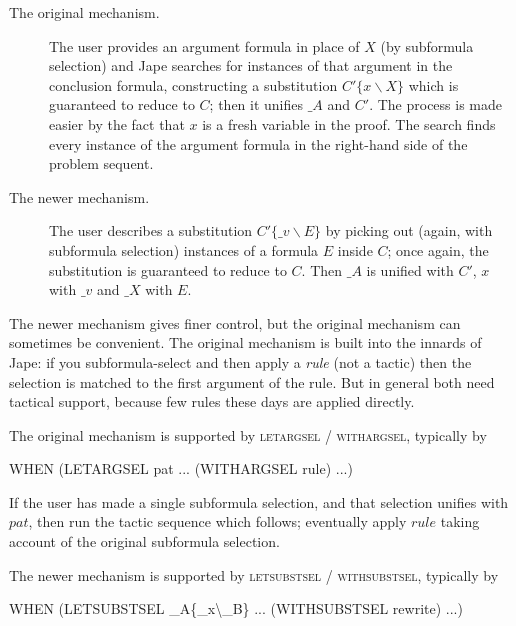\begin{description}
\item[The original mechanism.] 
The user provides an argument formula in place of $X$ (by subformula selection) and Jape searches for instances of that argument in the conclusion formula, constructing a substitution $C'\{x\backslash X\}$ which is guaranteed to reduce to $C$; then it unifies $\_A$ and $C'$. The process is made easier by the fact that $x$ is a fresh variable in the proof. The search finds every instance of the argument formula in the right-hand side of the problem sequent.

\item[The newer mechanism.]
The user describes a substitution $C'\{\_v\backslash E\}$ by picking out (again, with subformula selection) instances of a formula $E$ inside $C$; once again, the substitution is guaranteed to reduce to $C$. Then $\_A$ is unified with $C'$, $x$ with $\_v$ and $\_X$ with $E$. 
\end{description}
The newer mechanism gives finer control, but the original mechanism can sometimes be convenient. The original mechanism is built into the innards of Jape: if you subformula-select and then apply a \emph{rule} (not a tactic) then the selection is matched to the first argument of the rule. But in general both need tactical support, because few rules these days are applied directly. 

The original mechanism is supported by \textsc{letargsel} / \textsc{withargsel}, typically by 
\begin{japeish}
WHEN (LETARGSEL pat ... (WITHARGSEL rule) ...)
\end{japeish}
If the user has made a single subformula selection, and that selection unifies with $\mathit{pat}$, then run the tactic sequence which follows; eventually apply $\mathit{rule}$ taking account of the original subformula selection.

The newer mechanism is supported by \textsc{letsubstsel} / \textsc{withsubstsel}, typically by
\begin{japeish}
WHEN (LETSUBSTSEL \_A\{\_x\textbackslash \_B\} ... (WITHSUBSTSEL rewrite) ...)
\end{japeish}

